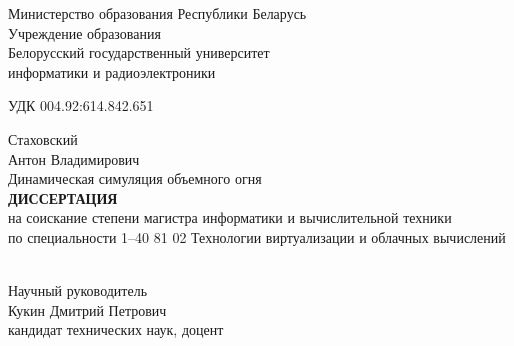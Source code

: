 \begin{titlepage}
    \begin{center}
        Министерство образования Республики Беларусь \\
        Учреждение образования \\
        Белорусский государственный университет \\
        информатики и радиоэлектроники \\[4em]
    \end{center}

    \begin{raggedright}
        \begin{minipage}{8cm}
            УДК 004.92:614.842.651 \\[1em]
        \end{minipage}
    \end{raggedright}

    \begin{center}
        Стаховский \\
        Антон Владимирович \\[6em]

        Динамическая симуляция объемного огня \\[3em]

        \MakeUppercase{\textbf{Диссертация}} \\
        на соискание степени магистра информатики и вычислительной техники \\
        по специальности 1--40 81 02 Технологии виртуализации и облачных вычислений \\ [4em]
    \end{center}

    \hfill
    \begin{raggedleft}
        \begin{minipage}{8cm}
            \hrulefill{} \\[1em]
            Научный руководитель \\[1em]
            Кукин Дмитрий Петрович \\[1em]
            кандидат технических наук, доцент \\[1em]
            \null\hrulefill{} \\[1em]
        \end{minipage}
    \end{raggedleft}


\end{titlepage}
